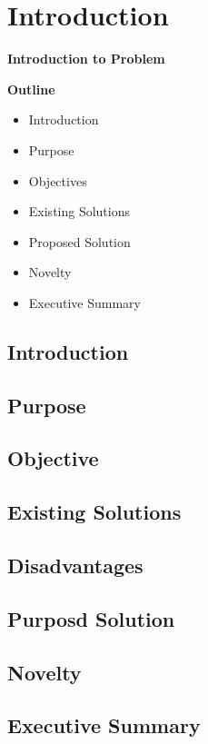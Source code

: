 \section{Introduction}

\vspace{20mm}

\Huge{\textbf{Introduction to Problem}}

\vspace{20mm}


\begin{abstract}
	\blindtext[2]
\end{abstract}

\vspace{20mm}

\large{\textbf{Outline}}

\begin{center}
	\begin{itemize}
		\item Introduction
		\item Purpose
		\item Objectives
		\item Existing Solutions
		\item Proposed Solution
		\item Novelty
		\item Executive Summary
	\end{itemize}
\end{center}
\pagebreak


\subsection{Introduction}
\blindtext[2]

\subsection{Purpose}
\blindtext[2]

\subsection{Objective}
\blindtext[2]

\subsection{Existing Solutions}
\blindtext[1]

\subsection{Disadvantages}
\blindtext[1]

\subsection{Purposd Solution}
\blindtext[2]

\subsection{Novelty}
\blindtext[1]

\subsection{Executive Summary}
\blindtext[2]

